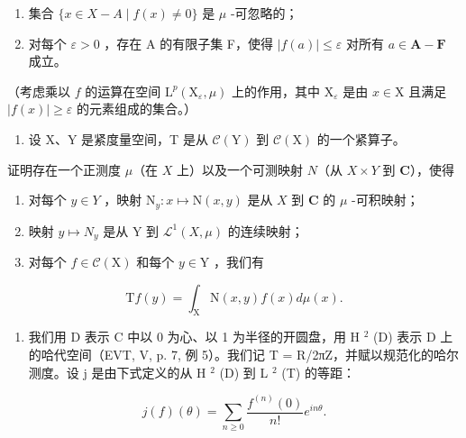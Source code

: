 \begin{enumerate}
\def\labelenumi{(\roman{enumi})}
\item
  集合 \(\{x\in X-A\mid f(x)\neq0\}\) 是 \(\mu\) -可忽略的；
\item
  对每个 \(\varepsilon > 0\) ，存在 A 的有限子集 F，使得 \(|f(a)| \leqslant \varepsilon\) 对所有 \(a \in \mathbf{A} - \mathbf{F}\) 成立。
\end{enumerate}

（考虑乘以 \(f\) 的运算在空间 \(\mathrm{L}^{p}(\mathrm{X}_{\varepsilon},\mu)\) 上的作用，其中 \(\mathrm{X}_{\varepsilon}\) 是由 \(x\in\mathrm{X}\) 且满足 \(|f(x)|\geqslant\varepsilon\) 的元素组成的集合。）

\begin{enumerate}
\def\labelenumi{\arabic{enumi})}
\setcounter{enumi}{19}
\tightlist
\item
  设 X、Y 是紧度量空间，T 是从 \(\mathcal{C}(\mathrm{Y})\) 到 \(\mathcal{C}(\mathrm{X})\) 的一个紧算子。
\end{enumerate}

证明存在一个正测度 \(\mu\)（在 \(X\) 上）以及一个可测映射 \(N\)（从 \(X \times Y\) 到 \(\mathbf{C}\)），使得

\begin{enumerate}
\def\labelenumi{\alph{enumi})}
\item
  对每个 \(y \in Y\) ，映射 \(\mathrm{N}_{y} \colon x \mapsto \mathrm{N}(x, y)\) 是从 \(X\) 到 \(\mathbf{C}\) 的 \(\mu\) -可积映射；
\item
  映射 \(y \mapsto N_{y}\) 是从 Y 到 \(\mathcal{L}^{1}(X, \mu)\) 的连续映射；
\item
  对每个 \(f \in \mathcal{C}(\mathrm{X})\) 和每个 \(y \in \mathrm{Y}\) ，我们有
\end{enumerate}

\[
\mathrm{T} f (y) = \int_ {\mathrm{X}} \mathrm{N} (x, y) f (x) d \mu (x).
\]

\begin{enumerate}
\def\labelenumi{\arabic{enumi})}
\setcounter{enumi}{20}
\tightlist
\item
  我们用 D 表示 C 中以 0 为心、以 1 为半径的开圆盘，用 H \(^{2}\) (D) 表示 D 上的哈代空间（EVT, V, p. 7, 例 5）。我们记 T = R/2πZ，并赋以规范化的哈尔测度。设 j 是由下式定义的从 H \(^{2}\) (D) 到 L \(^{2}\) (T) 的等距：
\end{enumerate}

\[
j (f) (\theta) = \sum_ {n \geqslant 0} \frac {f ^ {(n)} (0)}{n !} e ^ {i n \theta}.
\]

